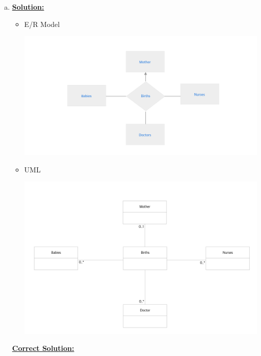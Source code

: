\documentclass[12pt]{article}
\begin{document}
\begin{enumerate}[1.]
    \begin{enumerate}[a)]
        \item

        \underline{\textbf{Solution:}}

        \begin{itemize}
            \item E/R Model
            \begin{center}
            \includegraphics[width=\linewidth]{images/worksheet_15_solution_25.png}
            \end{center}

            \item UML

            \begin{center}
            \includegraphics[width=\linewidth]{images/worksheet_15_solution_27.png}
            \end{center}
        \end{itemize}

        \begin{mdframed}
            \underline{\textbf{Correct Solution:}}


\end{mdframed}
\end{enumerate}
\end{enumerate}
\end{document}
